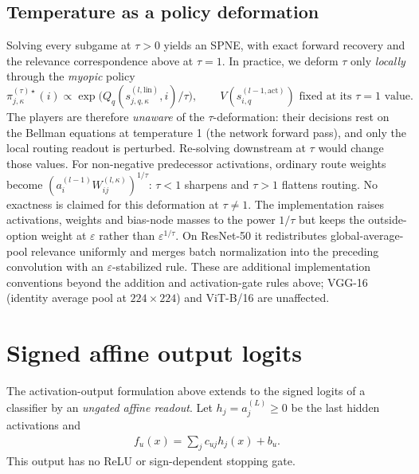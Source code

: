 \subsection{Temperature as a policy deformation}\label{ptnb:app:routing-temp}

Solving every subgame at $\tau>0$ yields an SPNE, with exact forward recovery and the relevance correspondence above at $\tau=1$. In practice, we deform $\tau$ only \emph{locally} through the \emph{myopic} policy
\begin{equation}\label{ptnb:eq:routing-gibbs-general-tau}
 \pi_{j,\kappa}^{(\tau)\star}(i)\propto
 \exp\!\bigl(Q_q(s_{j,q,\kappa}^{(l,\mathrm{lin})},i)/\tau\bigr),
 \qquad V(s_{i,q}^{(l-1,\mathrm{act})})\text{ fixed at its }\tau=1\text{ value}.
\end{equation}
The players are therefore \emph{unaware} of the $\tau$-deformation: their decisions rest on the Bellman equations at temperature 1 (the network forward pass), and only the local routing readout is perturbed. Re-solving downstream at $\tau$ would change those values. For non-negative predecessor activations, ordinary route weights become $(a_i^{(l-1)}W_{ij}^{(l,\kappa)})^{1/\tau}$: $\tau<1$ sharpens and $\tau>1$ flattens routing. No exactness is claimed for this deformation at $\tau\neq1$.
The implementation raises activations, weights and bias-node masses to the power $1/\tau$ but keeps the outside-option weight at $\varepsilon$ rather than $\varepsilon^{1/\tau}$. On ResNet-50 it redistributes global-average-pool relevance uniformly and merges batch normalization into the preceding convolution with an $\varepsilon$-stabilized rule. These are additional implementation conventions beyond the addition and activation-gate rules above; VGG-16 (identity average pool at $224\times224$) and ViT-B/16 are unaffected.

\section{Signed affine output logits}\label{ptnb:app:affine-readout}

The activation-output formulation above extends to the signed logits of a classifier by an
\emph{ungated affine readout}. Let $h_j=a_j^{(L)}\geq0$ be the last hidden activations and
\begin{align}\label{ptnb:eq:affine-readout}
    f_u(x)=\sum_j c_{uj}h_j(x)+b_u.
\end{align}
This output has no ReLU or sign-dependent stopping gate.

